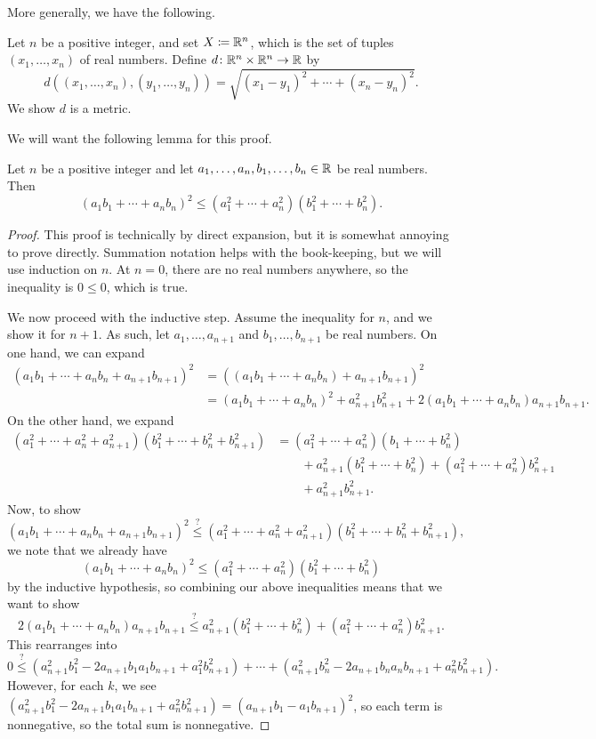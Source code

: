 \documentclass[../main.tex]{subfiles}
\begin{document}
More generally, we have the following.
\begin{proposition} \label{prop:rn-is-metric}
    Let $n$ be a positive integer, and set $X\coloneqq\mathbb R^n$, which is the set of tuples $(x_1,\ldots,x_n)$ of real numbers. Define $d\colon\mathbb R^n\times\mathbb R^n\to\mathbb R$ by
    \[d((x_1,\ldots,x_n),(y_1,\ldots,y_n)) = \sqrt{(x_1 - y_1)^2 + \cdots +(x_n - y_n)^2}.\]
    We show $d$ is a metric.
\end{proposition}
We will want the following lemma for this proof.
\begin{lemma} \label{lem:cs}
    Let $n$ be a positive integer and let $a_1,\ldots,a_n,b_1,\ldots,b_n\in\mathbb R$ be real numbers. Then
    \[(a_1b_1+\cdots+a_nb_n)^2\le\left(a_1^2+\cdots+a_n^2\right)\left(b_1^2+\cdots+b_n^2\right).\]
\end{lemma}
\begin{proof}
    This proof is technically by direct expansion, but it is somewhat annoying to prove directly. Summation notation helps with the book-keeping, but we will use induction on $n$. At $n=0$, there are no real numbers anywhere, so the inequality is $0\le0$, which is true.

    We now proceed with the inductive step. Assume the inequality for $n$, and we show it for $n+1$. As such, let $a_1,\ldots,a_{n+1}$ and $b_1,\ldots,b_{n+1}$ be real numbers. On one hand, we can expand
    \begin{align*}
        (a_1b_1+\cdots+a_nb_n+a_{n+1}b_{n+1})^2 &= ((a_1b_1+\cdots+a_nb_n)+a_{n+1}b_{n+1})^2 \\
        &= (a_1b_1+\cdots+a_nb_n)^2+a_{n+1}^2b_{n+1}^2+2(a_1b_1+\cdots+a_nb_n)a_{n+1}b_{n+1}.
    \end{align*}
    On the other hand, we expand
    \begin{align*}
        \left(a_1^2+\cdots+a_n^2+a_{n+1}^2\right)\left(b_1^2+\cdots+b_n^2+b_{n+1}^2\right) &= \left(a_1^2+\cdots+a_n^2\right)\left(b_1+\cdots+b_n^2\right) \\
        &\qquad+a_{n+1}^2\left(b_1^2+\cdots+b_n^2\right)+\left(a_1^2+\cdots+a_n^2\right)b_{n+1}^2 \\
        &\qquad+a_{n+1}^2b_{n+1}^2.
    \end{align*}
    Now, to show
    \[(a_1b_1+\cdots+a_nb_n+a_{n+1}b_{n+1})^2\stackrel?\le\left(a_1^2+\cdots+a_n^2+a_{n+1}^2\right)\left(b_1^2+\cdots+b_n^2+b_{n+1}^2\right),\]
    we note that we already have
    \[(a_1b_1+\cdots+a_nb_n)^2\le\left(a_1^2+\cdots+a_n^2\right)\left(b_1^2+\cdots+b_n^2\right)\]
    by the inductive hypothesis, so combining our above inequalities means that we want to show
    \[2(a_1b_1+\cdots+a_nb_n)a_{n+1}b_{n+1}\stackrel?\le a_{n+1}^2\left(b_1^2+\cdots+b_n^2\right)+\left(a_1^2+\cdots+a_n^2\right)b_{n+1}^2.\]
    This rearranges into
    \[0\stackrel?\le\left(a_{n+1}^2b_1^2-2a_{n+1}b_1a_1b_{n+1}+a_1^2b_{n+1}^2\right)+\cdots+\left(a_{n+1}^2b_n^2-2a_{n+1}b_na_nb_{n+1}+a_n^2b_{n+1}^2\right).\]
    However, for each $k$, we see $\left(a_{n+1}^2b_1^2-2a_{n+1}b_1a_1b_{n+1}+a_n^2b_{n+1}^2\right)=(a_{n+1}b_1-a_1b_{n+1})^2$, so each term is nonnegative, so the total sum is nonnegative.
\end{proof}
\end{document}
